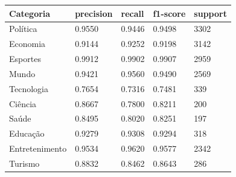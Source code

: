 \begin{tabular}{lllll}
\hline
Categoria & precision & recall & f1-score & support \\
\hline
Política & 0.9550 & 0.9446 & 0.9498 & 3302 \\
Economia & 0.9144 & 0.9252 & 0.9198 & 3142 \\
Esportes & 0.9912 & 0.9902 & 0.9907 & 2959 \\
Mundo & 0.9421 & 0.9560 & 0.9490 & 2569 \\
Tecnologia & 0.7654 & 0.7316 & 0.7481 & 339 \\
Ciência & 0.8667 & 0.7800 & 0.8211 & 200 \\
Saúde & 0.8495 & 0.8020 & 0.8251 & 197 \\
Educação & 0.9279 & 0.9308 & 0.9294 & 318 \\
Entretenimento & 0.9534 & 0.9620 & 0.9577 & 2342 \\
Turismo & 0.8832 & 0.8462 & 0.8643 & 286 \\
\hline
\end{tabular}
